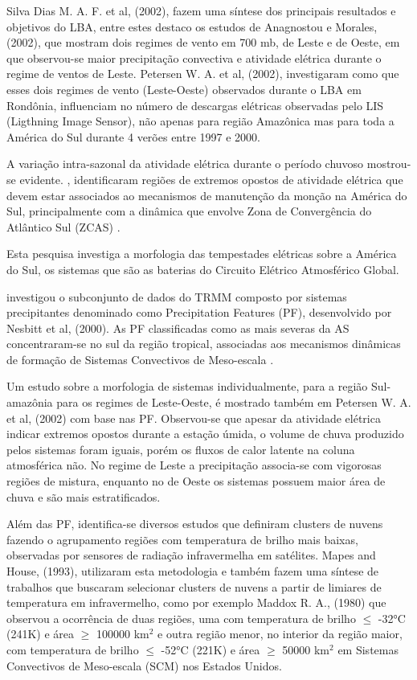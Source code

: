 Silva Dias M. A. F. et al, (2002), fazem uma síntese dos principais resultados e objetivos do LBA, entre estes destaco os estudos de Anagnostou e Morales, (2002),  que mostram dois regimes de vento em 700 mb, de Leste e de Oeste, em que observou-se maior precipitação convectiva e atividade elétrica durante o regime de ventos de Leste. Petersen W. A. et al, (2002), investigaram como que esses dois regimes de vento (Leste-Oeste) observados durante o LBA em Rondônia, influenciam no número de descargas elétricas observadas pelo LIS (Ligthning Image Sensor), não apenas para região Amazônica mas para toda a América do Sul durante 4 verões entre 1997 e 2000.

A variação intra-sazonal da atividade elétrica durante o período chuvoso mostrou-se evidente. ,  identificaram regiões de extremos opostos de atividade elétrica que devem estar associados ao mecanismos de manutenção da monção na América do Sul, principalmente com a dinâmica que envolve Zona de Convergência do Atlântico Sul (ZCAS) \cite{CarvalhoJones2002,Carvalho2002}.   

Esta pesquisa investiga a morfologia das tempestades elétricas sobre a América do Sul, os sistemas que são as baterias do Circuito Elétrico Atmosférico Global. 

 investigou o subconjunto de dados do TRMM composto por sistemas precipitantes denominado como Precipitation Features (PF), desenvolvido por Nesbitt et al, (2000). As PF classificadas como as mais severas da AS concentraram-se no sul da região tropical, associadas aos mecanismos dinâmicas de formação de Sistemas Convectivos de Meso-escala \cite{Velasco1987,Durkee2009}. 

Um estudo sobre a morfologia de sistemas individualmente, para a região Sul- amazônia para os regimes de Leste-Oeste, é mostrado também em Petersen W. A. et al, (2002) com base nas PF. Observou-se que apesar da atividade elétrica indicar extremos opostos durante a estação úmida, o volume de chuva produzido pelos sistemas foram iguais, porém os fluxos de calor latente na coluna atmosférica não. No regime de Leste a precipitação associa-se com vigorosas regiões de mistura, enquanto no de Oeste os sistemas possuem maior área de chuva e são mais estratificados.

Além das PF, identifica-se diversos estudos que definiram clusters de nuvens fazendo o agrupamento regiões com temperatura de brilho mais baixas, observadas por sensores de radiação infravermelha em satélites.  Mapes and House, (1993), utilizaram esta metodologia e também fazem uma síntese de trabalhos que buscaram selecionar clusters de nuvens a partir de limiares de temperatura em infravermelho, como por exemplo Maddox R. A., (1980) que observou a ocorrência de duas regiões, uma com temperatura de brilho $\leqslant$ -32°C (241K) e área $\geqslant$ 100000 km$^2$ e outra região menor, no interior da região maior, com temperatura de brilho $\leqslant$ -52°C (221K) e área $\geqslant$ 50000 km$^2$ em Sistemas Convectivos de Meso-escala (SCM) nos Estados Unidos.

